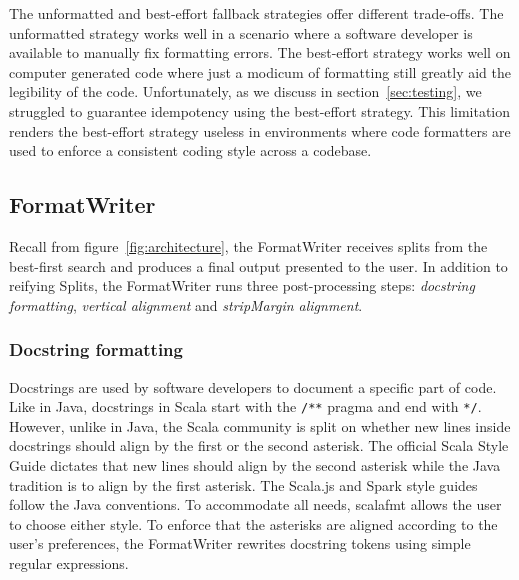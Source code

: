 The unformatted and best-effort fallback strategies offer different trade-offs.
The unformatted strategy works well in a scenario where a software developer is available to manually fix formatting errors.
The best-effort strategy works well on computer generated code where just a modicum of formatting still greatly aid the legibility of the code.
Unfortunately, as we discuss in section~\ref{sec:testing}, we struggled to guarantee idempotency using the best-effort strategy.
This limitation renders the best-effort strategy useless in environments where code formatters are used to enforce a consistent coding style across a codebase.


\subsection{FormatWriter}
Recall from figure~\ref{fig:architecture}, the FormatWriter receives splits from the best-first search and produces a final output presented to the user.
In addition to reifying Splits, the FormatWriter runs three post-processing steps: \emph{docstring formatting}, \emph{vertical alignment} and \emph{stripMargin alignment}.

\subsubsection{Docstring formatting}\label{sec:docstring}
Docstrings are used by software developers to document a specific part of code.
Like in Java, docstrings in Scala start with the \texttt{/**} pragma and end with \texttt{*/}.
However, unlike in Java, the Scala community is split on whether new lines inside docstrings should align by the first or the second asterisk.
The official Scala Style Guide\autocite{Scala80:online} dictates that new lines should align by the second asterisk while the Java tradition is to align by the first asterisk.
The Scala.js\autocite{doeraene_scala.js_2015} and Spark\autocite{xin_spark_2015} style guides follow the Java conventions.
To accommodate all needs, scalafmt allows the user to choose either style.
To enforce that the asterisks are aligned according to the user's preferences,
the FormatWriter rewrites docstring tokens using simple regular expressions.

